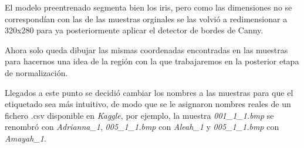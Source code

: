 El modelo preentrenado segmenta bien los iris, pero como las dimensiones no se correspondían con las de las muestras orginales se las volvió a redimensionar a 320x280 para ya posteriormente aplicar el detector de bordes de Canny.

Ahora solo queda dibujar las mismas coordenadas encontradas en las muestras para hacernos una idea de la región con la que trabajaremos en la posterior etapa de normalización.


Llegados a este punto se decidió cambiar los nombres a las muestras para que el etiquetado sea más intuitivo, de modo que se le asignaron nombres reales de un fichero .csv disponible en \emph{Kaggle}, por ejemplo, la muestra \emph{001\_1\_1.bmp} se renombró con \emph{Adrianna\_1}, \emph{005\_1\_1.bmp} con \emph{Aleah\_1} y \emph{005\_1\_1.bmp} con \emph{Amayah\_1}.


